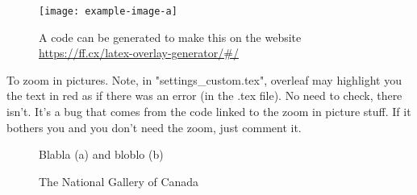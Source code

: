 \documentclass[../main.tex]{subfiles}
\begin{document}
\begin{figure}[h!t]
  \begin{annotatedFigure}
    {\texttt{[image: example-image-a]}}
  \end{annotatedFigure}

  \caption{A code can be generated to make this on the website\\ \href{https://ff.cx/latex-overlay-generator/\#/}{https://ff.cx/latex-overlay-generator/\#/}}
  \label{fig:teaser}
\end{figure}

\clearpage
To zoom in pictures. Note, in "settings\_custom.tex", overleaf may highlight you the text in red as if there was an error (in the .tex file). No need to check, there isn't. It's a bug that comes from the code linked to the zoom in picture stuff. If it bothers you and you don't need the zoom, just comment it.
\begin{figure}[h]
    \centering
    \caption{Blabla (a) and bloblo (b)}
    \label{fig_Vout_plateau}
\end{figure}

\begin{figure}[h]
    \centering
    \caption{The National Gallery of Canada}
\end{figure}
\end{document}
